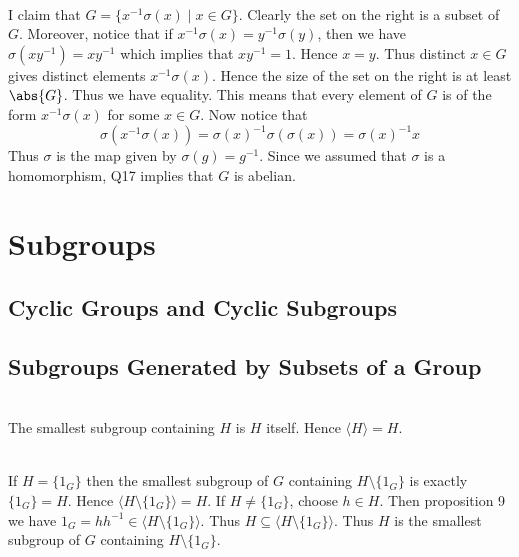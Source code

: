 \documentclass[a4paper]{article}
\begin{document}
\begin{ex}{}{}\\
I claim that $G=\{x^{-1}\sigma(x)\;|\;x\in G\}$. Clearly the set on the right is a subset of $G$. Moreover, notice that if $x^{-1}\sigma(x)=y^{-1}\sigma(y)$, then we have $\sigma(xy^{-1})=xy^{-1}$ which implies that $xy^{-1}=1$. Hence $x=y$. Thus distinct $x\in G$ gives distinct elements $x^{-1}\sigma(x)$. Hence the size of the set on the right is at least $\abs{G}$. Thus we have equality. This means that every element of $G$ is of the form $x^{-1}\sigma(x)$ for some $x\in G$. Now notice that $$\sigma(x^{-1}\sigma(x))=\sigma(x)^{-1}\sigma(\sigma(x))=\sigma(x)^{-1}x$$ Thus $\sigma$ is the map given by $\sigma(g)=g^{-1}$. Since we assumed that $\sigma$ is a homomorphism, Q17 implies that $G$ is abelian. 
\end{ex}

\pagebreak
\section{Subgroups}
\subsection{}
\subsection{}
\subsection{Cyclic Groups and Cyclic Subgroups}
\subsection{Subgroups Generated by Subsets of a Group}
\begin{ex}{}{}\\
The smallest subgroup containing $H$ is $H$ itself. Hence $\langle H\rangle=H$. 
\end{ex}

\begin{ex}{}{}
\end{ex}

\begin{ex}{}{}
\end{ex}

\begin{ex}{}{}\\
If $H=\{1_G\}$ then the smallest subgroup of $G$ containing $H\setminus\{1_G\}$ is exactly $\{1_G\}=H$. Hence $\langle H\setminus\{1_G\}\rangle=H$. If $H\neq\{1_G\}$, choose $h\in H$. Then proposition 9 we have $1_G=hh^{-1}\in\langle H\setminus\{1_G\}\rangle$. Thus $H\subseteq\langle H\setminus\{1_G\}\rangle$. Thus $H$ is the smallest subgroup of $G$ containing $H\setminus\{1_G\}$. 
\end{ex}
\end{document}
